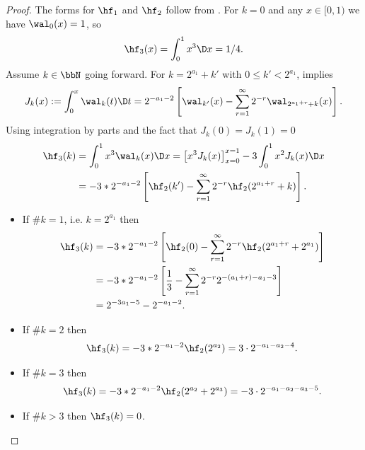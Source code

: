 \documentclass[acmsmall]{acmart}
\begin{document}
\begin{proof}
    The forms for $\hf_1$ and $\hf_2$ follow from \citep[Example 14.2, Example 14.3]{dick.digital_nets_sequences_book}. 
    For $k=0$ and any $x \in [0,1)$ we have $\wal_0(x) = 1$, so  
    $$\hf_3(x) = \int_0^1 x^3 \D x = 1/4.$$ 
    Assume $k \in \bbN$ going forward. For $k=2^{a_1}+k'$ with $0 \leq k' < 2^{a_1}$, \citep[Equation 3.6]{fine.walsh_functions} implies
    $$J_k(x) := \int_0^x \wal_k(t) \D t = 2^{-a_1-2} \left[\wal_{k'}(x) - \sum_{r=1}^\infty 2^{-r} \wal_{2^{a_1+r}+k}(x)\right].$$
    Using integration by parts and the fact that $J_k(0) = J_k(1) = 0$
    \begin{align*}
        \hf_3(k) &= \int_0^1 x^3 \wal_k(x) \D x 
        = \left[x^3 J_k(x) \right]_{x=0}^{x=1} - 3 \int_0^1 x^2 J_k(x) \D x \\
        &= -3*2^{-a_1-2} \left[\hf_2(k') - \sum_{r=1}^\infty 2^{-r} \hf_2(2^{a_1+r}+k)\right].
    \end{align*}
    \begin{itemize}
        \item If $\#k=1$, i.e. $k=2^{a_1}$ then 
        \begin{align*}
            \hf_3(k) &= -3*2^{-a_1-2} \left[\hf_2(0) - \sum_{r=1}^\infty 2^{-r} \hf_2(2^{a_1+r}+2^{a_1})\right] \\
            &= -3*2^{-a_1-2} \left[\frac{1}{3} - \sum_{r=1}^\infty 2^{-r} 2^{-(a_1+r)-a_1-3}\right] \\
            &= 2^{-3a_1-5} - 2^{-a_1-2}.
        \end{align*}
        \item If $\#k=2$ then 
        $$\hf_3(k) = -3*2^{-a_1-2} \hf_2(2^{a_2}) = 3 \cdot 2^{-a_1-a_2-4}.$$
        \item If $\#k=3$ then 
        $$\hf_3(k) = -3*2^{-a_1-2} \hf_2(2^{a_2}+2^{a_3}) = -3 \cdot 2^{-a_1-a_2-a_3-5}.$$
        \item If $\#k>3$ then $\hf_3(k)=0$.
    \end{itemize}
\end{proof}
\end{document}
